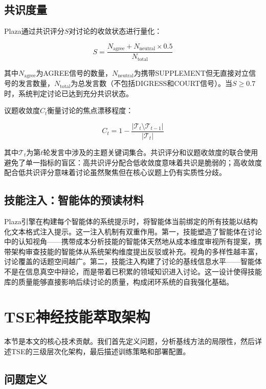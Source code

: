 \documentclass[conference]{IEEEtran}
\begin{document}
\subsection{共识度量}

Plaza通过共识评分$S$对讨论的收敛状态进行量化：

\begin{equation}
S = \frac{N_{\mathrm{agree}} + N_{\mathrm{neutral}} \times 0.5}{N_{\mathrm{total}}}
\label{eq:consensus}
\end{equation}

其中$N_{\mathrm{agree}}$为AGREE信号的数量，$N_{\mathrm{neutral}}$为携带SUPPLEMENT但无直接对立信号的发言数量，$N_{\mathrm{total}}$为总发言数（不包括DIGRESS和COURT信号）。当$S \geq 0.7$时，系统判定讨论已达到充分共识状态。

议题收敛度$C_t$衡量讨论的焦点漂移程度：

\begin{equation}
C_t = 1 - \frac{|\mathcal{T}_t \setminus \mathcal{T}_{t-1}|}{|\mathcal{T}_t|}
\label{eq:convergence}
\end{equation}

其中$\mathcal{T}_t$为第$t$轮发言中涉及的主题关键词集合。共识评分和议题收敛度的联合使用避免了单一指标的盲区：高共识评分配合低收敛度意味着共识是脆弱的；高收敛度配合低共识评分意味着讨论虽然聚焦但在核心议题上仍有实质性分歧。

\subsection{技能注入：智能体的预读材料}

Plaza引擎在构建每个智能体的系统提示时，将智能体当前绑定的所有技能以结构化文本格式注入提示。这一注入机制有双重作用。第一，技能塑造了智能体在讨论中的认知视角——携带成本分析技能的智能体天然地从成本维度审视所有提案，携带架构审查技能的智能体从系统架构维度提出反驳或补充。视角的多样性越丰富，讨论覆盖的话题空间越广。第二，技能注入构建了讨论的基线信息水平——智能体不是在信息真空中辩论，而是带着已积累的领域知识进入讨论。这一设计使得技能库的质量能够直接影响后续讨论的质量，构成闭环系统的自我强化基础。

\section{TSE神经技能萃取架构}

本节是本文的核心技术贡献。我们首先定义问题，分析基线方法的局限性，然后详述TSE的三级层次化架构，最后描述训练策略和部署配置。

\subsection{问题定义}
\end{document}
